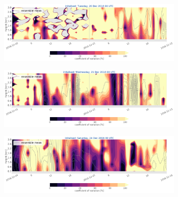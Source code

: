
\begin{figure}[t]
	\centering
	\begin{subfigure}[t]{\textwidth}		\includegraphics[trim={0.cm 5.3cm 0cm 0cm},clip,width=\textwidth]{./fig_variation/20161220}
		\caption{}\label{fig:ens_vari20}
	\end{subfigure}
	\begin{subfigure}[t]{\textwidth}		\includegraphics[trim={0.cm 5.3cm 0cm 0cm},clip,width=\textwidth]{./fig_variation/20161221}
		\caption{}\label{fig:ens_vari21}
	\end{subfigure}
	
	\begin{subfigure}[t]{\textwidth}		\includegraphics[trim={15.cm 0cm 15cm 21cm},clip,width=\textwidth]{./fig_variation/20161224}
	\end{subfigure}
\end{figure}
